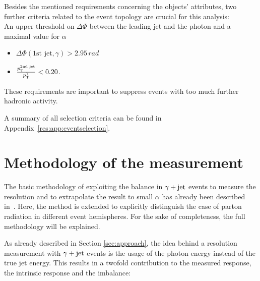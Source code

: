 Besides the mentioned requirements concerning the objects' attributes, two further criteria related to the event topology are crucial for this analysis:\\
An upper threshold on $\Delta \Phi$ between the leading jet and the photon and a maximal value for $\alpha$
\begin{itemize}
 \item $\Delta \Phi \left(\text{1st jet}, \gamma \right) > 2.95\,\unit{rad}$
 \item $\frac{p_{\text{T}}^{\text{2nd jet}}}{p_{\text{T}}^{\gamma}} < 0.20$.
\end{itemize}
These requirements are important to suppress events with too much further hadronic activity.

A summary of all selection criteria can be found in Appendix~\ref{res:app:eventselection}.

\chapter{Methodology of the measurement}


The basic methodology of exploiting the \pt balance in $\gamma + \text{jet}$ events to measure the resolution and to extrapolate the result to small $\alpha$ has already been described
\mbox{in \cite{CMS-AN-2010-076}}. 
Here, the method is extended to explicitly distinguish the case of parton radiation in different event hemispheres.
For the sake of completeness, the full methodology will be explained.

As already described in Section \ref{sec:approach}, the idea behind a resolution measurement with $\gamma + \text{jet}$ events is the usage of the photon energy instead of the true jet energy.
This results in a twofold contribution to the measured response, the intrinsic response and the imbalance:

